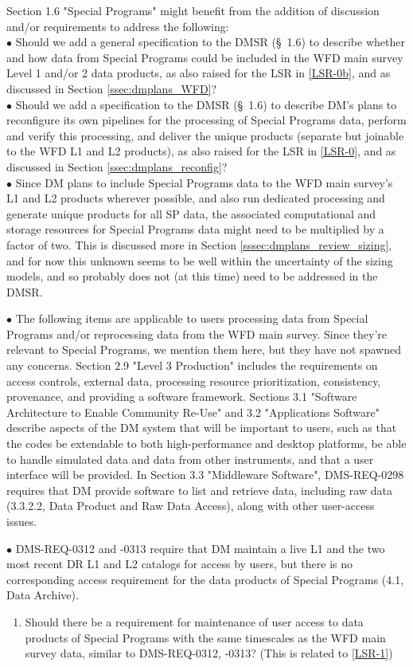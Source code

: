 \documentclass[DM,lsstdraft,toc]{lsstdoc}
\begin{document}
Section 1.6 "Special Programs" might benefit from the addition of discussion and/or requirements to address the following: \\
$\bullet$ Should we add a general specification to the DMSR (\S~1.6) to describe whether and how data from Special Programs could be included in the WFD main survey Level 1 and/or 2 data products, as also raised for the LSR in \ref{LSR-0b}, and as discussed in Section \ref{ssec:dmplans_WFD}? \\
$\bullet$ Should we add a specification to the DMSR (\S~1.6) to describe DM's plans to reconfigure its own pipelines for the processing of Special Programs data, perform and verify this processing, and deliver the unique products (separate but joinable to the WFD L1 and L2 products), as also raised for the LSR in \ref{LSR-0}, and as discussed in Section \ref{ssec:dmplans_reconfig}? \\
$\bullet$ Since DM plans to include Special Programs data to the WFD main survey's L1 and L2 products wherever possible, and also run dedicated processing and generate unique products for all SP data, the associated computational and storage resources for Special Programs data might need to be multiplied by a factor of two. This is discussed more in Section \ref{sssec:dmplans_review_sizing}, and for now this unknown seems to be well within the uncertainty of the sizing models, and so probably does not (at this time) need to be addressed in the DMSR.

$\bullet$ The following items are applicable to users processing data from Special Programs and/or reprocessing data from the WFD main survey. Since they're relevant to Special Programs, we mention them here, but they have not spawned any concerns. Section 2.9 "Level 3 Production" includes the requirements on access controls, external data, processing resource prioritization, consistency, provenance, and providing a software framework. Sections 3.1 "Software Architecture to Enable Community Re-Use" and 3.2 "Applications Software" describe aspects of the DM system that will be important to users, such as that the codes be extendable to both high-performance and desktop platforms, be able to handle simulated data and data from other instruments, and that a user interface will be provided. In Section 3.3 "Middleware Software", DMS-REQ-0298 requires that DM provide software to list and retrieve data, including raw data (3.3.2.2, Data Product and Raw Data Access), along with other user-access issues.

$\bullet$ DMS-REQ-0312 and -0313 require that DM maintain a live L1 and the two most recent DR L1 and L2 catalogs for access by users, but there is no corresponding access requirement for the data products of Special Programs (4.1, Data Archive).
\begin{enumerate}[topsep=-10pt,after=\vspace{10pt},label= \textbf{Concern \Roman*.},resume] \item \label{DMSR-10} Should there be a requirement for maintenance of user access to data products of Special Programs with the same timescales as the WFD main survey data, similar to DMS-REQ-0312, -0313? (This is related to \ref{LSR-1}) \end{enumerate}
\end{document}
